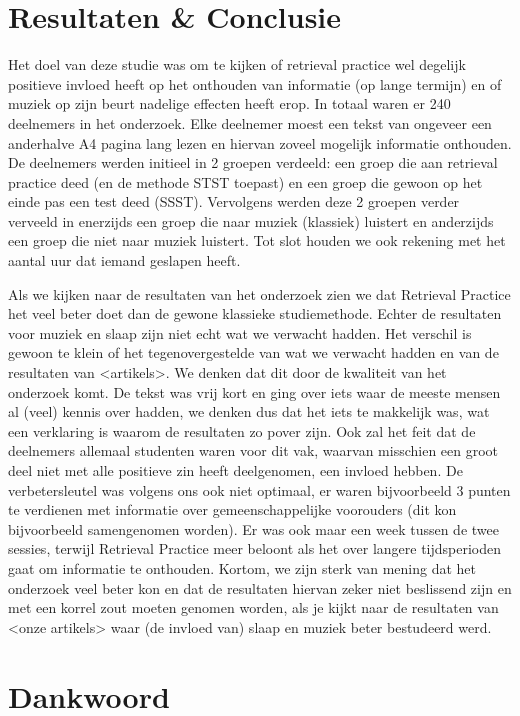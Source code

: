 \documentclass{hogent-article}
\begin{document}
\section{Resultaten \& Conclusie }

Het doel van deze studie was om te kijken of retrieval practice wel degelijk positieve invloed heeft op het onthouden van informatie (op lange termijn) en of muziek op zijn beurt nadelige effecten heeft erop. In totaal waren er 240 deelnemers in het onderzoek. Elke deelnemer moest een tekst van ongeveer een anderhalve A4 pagina lang lezen en hiervan zoveel mogelijk informatie onthouden. De deelnemers werden initieel in 2 groepen verdeeld: een groep die aan retrieval practice deed (en de methode STST toepast) en een groep die gewoon op het einde pas een test deed (SSST). Vervolgens werden deze 2 groepen verder verveeld in enerzijds een groep die naar muziek (klassiek) luistert en anderzijds een groep die niet naar muziek luistert. Tot slot houden we ook rekening met het aantal uur dat iemand geslapen heeft.

Als we kijken naar de resultaten van het onderzoek zien we dat Retrieval Practice het veel beter doet dan de gewone klassieke studiemethode. Echter de resultaten voor muziek en slaap zijn niet echt wat we verwacht hadden. Het verschil is gewoon te klein of het tegenovergestelde van wat we verwacht hadden en van de resultaten van <artikels>. We denken dat dit door de kwaliteit van het onderzoek komt. De tekst was vrij kort en ging over iets waar de meeste mensen al (veel) kennis over hadden, we denken dus dat het iets te makkelijk was, wat een verklaring is waarom de resultaten zo pover zijn. Ook zal het feit dat de deelnemers allemaal studenten waren voor dit vak, waarvan misschien een groot deel niet met alle positieve zin heeft deelgenomen, een invloed hebben. De verbetersleutel was volgens ons ook niet optimaal, er waren bijvoorbeeld 3 punten te verdienen met informatie over gemeenschappelijke voorouders (dit kon bijvoorbeeld samengenomen worden). Er was ook maar een week tussen de twee sessies, terwijl Retrieval Practice meer beloont als het over langere tijdsperioden gaat om informatie te onthouden. Kortom, we zijn sterk van mening dat het onderzoek veel beter kon en dat de resultaten hiervan zeker niet beslissend zijn en met een korrel zout moeten genomen worden, als je kijkt naar de resultaten van <onze artikels> waar (de invloed van) slaap en muziek beter bestudeerd werd.



\section{Dankwoord}


\printbibliography[heading=bibintoc]
\end{document}
